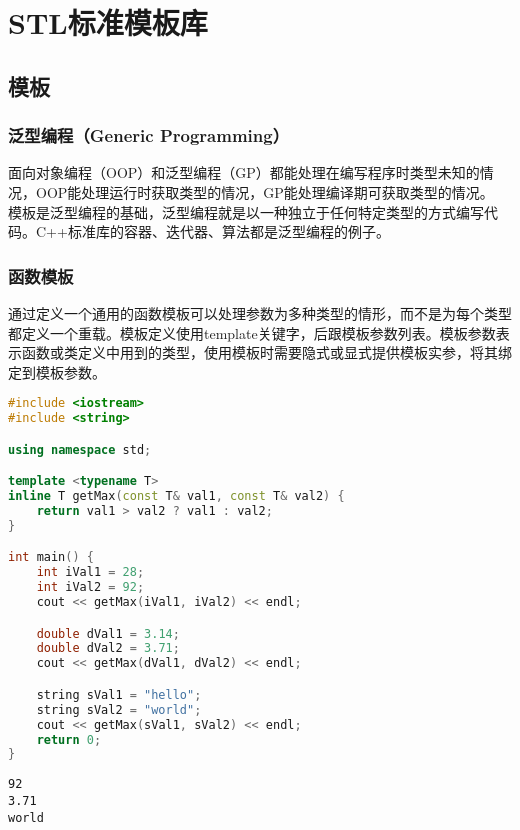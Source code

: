 \chapter{STL标准模板库}

\section{模板}

\subsection{泛型编程（Generic Programming）}

面向对象编程（OOP）和泛型编程（GP）都能处理在编写程序时类型未知的情况，OOP能处理运行时获取类型的情况，GP能处理编译期可获取类型的情况。 \\

模板是泛型编程的基础，泛型编程就是以一种独立于任何特定类型的方式编写代码。C++标准库的容器、迭代器、算法都是泛型编程的例子。

\subsection{函数模板}

通过定义一个通用的函数模板可以处理参数为多种类型的情形，而不是为每个类型都定义一个重载。模板定义使用template关键字，后跟模板参数列表。模板参数表示函数或类定义中用到的类型，使用模板时需要隐式或显式提供模板实参，将其绑定到模板参数。 \\


\begin{lstlisting}[language=C++]
#include <iostream>
#include <string>

using namespace std;

template <typename T>
inline T getMax(const T& val1, const T& val2) {
    return val1 > val2 ? val1 : val2;
}

int main() {
    int iVal1 = 28;
    int iVal2 = 92;
    cout << getMax(iVal1, iVal2) << endl;

    double dVal1 = 3.14;
    double dVal2 = 3.71;
    cout << getMax(dVal1, dVal2) << endl;

    string sVal1 = "hello";
    string sVal2 = "world";
    cout << getMax(sVal1, sVal2) << endl;
    return 0;
}
\end{lstlisting}

\begin{tcolorbox}
	\begin{verbatim}
92
3.71
world
	\end{verbatim}
\end{tcolorbox}

